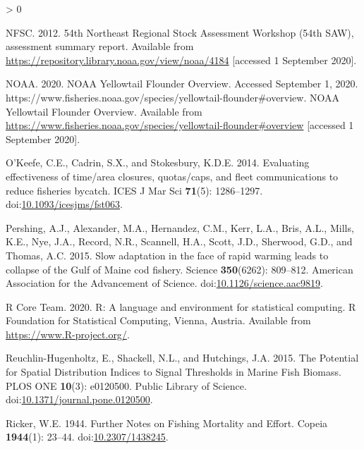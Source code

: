 \documentclass[
]{article}
\newlength{\cslhangindent}
\newenvironment{CSLReferences}[2] %
 {%
  \setlength{\parindent}{0pt}
  \ifodd #1 \everypar{\setlength{\hangindent}{\cslhangindent}}\ignorespaces\fi
  \ifnum #2 > 0
  \setlength{\parskip}{#2\baselineskip}
  \fi
 }%
 {}
\begin{document}
\begin{CSLReferences}{1}{0}
\leavevmode\hypertarget{ref-nfsc54thNortheastRegional2012}{}%
NFSC. 2012. 54th {Northeast Regional Stock Assessment Workshop} (54th {SAW}), assessment summary report. Available from \url{https://repository.library.noaa.gov/view/noaa/4184} {[}accessed 1 September 2020{]}.

\leavevmode\hypertarget{ref-noaaNOAAYellowtailFlounder2020}{}%
NOAA. 2020. {NOAA Yellowtail Flounder Overview}. {Accessed September} 1, 2020. {https://www.fisheries.noaa.gov/species/yellowtail-flounder\#overview}. {NOAA Yellowtail Flounder Overview}. Available from \url{https://www.fisheries.noaa.gov/species/yellowtail-flounder\#overview} {[}accessed 1 September 2020{]}.

\leavevmode\hypertarget{ref-okeefeEvaluatingEffectivenessTime2014}{}%
O'Keefe, C.E., Cadrin, S.X., and Stokesbury, K.D.E. 2014. Evaluating effectiveness of time/area closures, quotas/caps, and fleet communications to reduce fisheries bycatch. ICES J Mar Sci \textbf{71}(5): 1286--1297. doi:\href{https://doi.org/10.1093/icesjms/fst063}{10.1093/icesjms/fst063}.

\leavevmode\hypertarget{ref-pershingSlowAdaptationFace2015}{}%
Pershing, A.J., Alexander, M.A., Hernandez, C.M., Kerr, L.A., Bris, A.L., Mills, K.E., Nye, J.A., Record, N.R., Scannell, H.A., Scott, J.D., Sherwood, G.D., and Thomas, A.C. 2015. Slow adaptation in the face of rapid warming leads to collapse of the {Gulf} of {Maine} cod fishery. Science \textbf{350}(6262): 809--812. {American Association for the Advancement of Science}. doi:\href{https://doi.org/10.1126/science.aac9819}{10.1126/science.aac9819}.

\leavevmode\hypertarget{ref-rcoreteamLanguageEnvironmentStatistical2020}{}%
R Core Team. 2020. R: {A} language and environment for statistical computing. {R Foundation for Statistical Computing}, {Vienna, Austria}. Available from \url{https://www.R-project.org/}.

\leavevmode\hypertarget{ref-reuchlin-hugenholtzPotentialSpatialDistribution2015}{}%
Reuchlin-Hugenholtz, E., Shackell, N.L., and Hutchings, J.A. 2015. The {Potential} for {Spatial Distribution Indices} to {Signal Thresholds} in {Marine Fish Biomass}. PLOS ONE \textbf{10}(3): e0120500. {Public Library of Science}. doi:\href{https://doi.org/10.1371/journal.pone.0120500}{10.1371/journal.pone.0120500}.

\leavevmode\hypertarget{ref-rickerFurtherNotesFishing1944}{}%
Ricker, W.E. 1944. Further {Notes} on {Fishing Mortality} and {Effort}. Copeia \textbf{1944}(1): 23--44. doi:\href{https://doi.org/10.2307/1438245}{10.2307/1438245}.


\end{CSLReferences}
\end{document}
